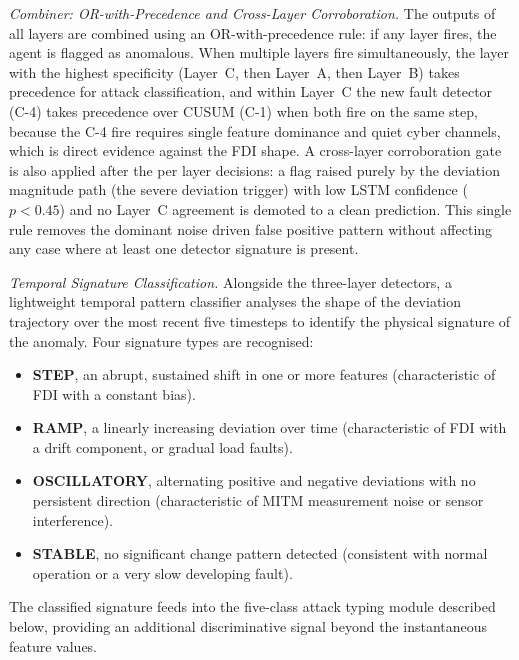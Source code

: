 \par \vspace{0.2cm}
\textit{Combiner: OR-with-Precedence and Cross-Layer Corroboration.} The outputs of all layers are combined using an OR-with-precedence rule: if any layer fires, the agent is flagged as anomalous. When multiple layers fire simultaneously, the layer with the highest specificity (Layer~C, then Layer~A, then Layer~B) takes precedence for attack classification, and within Layer~C the new fault detector (C-4) takes precedence over CUSUM (C-1) when both fire on the same step, because the C-4 fire requires single feature dominance and quiet cyber channels, which is direct evidence against the FDI shape. A cross-layer corroboration gate is also applied after the per layer decisions: a flag raised purely by the deviation magnitude path (the severe deviation trigger) with low LSTM confidence ($p < 0.45$) and no Layer~C agreement is demoted to a clean prediction. This single rule removes the dominant noise driven false positive pattern without affecting any case where at least one detector signature is present.

\par \vspace{0.2cm}
\textit{Temporal Signature Classification.} Alongside the three-layer detectors, a lightweight temporal pattern classifier analyses the shape of the deviation trajectory over the most recent five timesteps to identify the physical signature of the anomaly. Four signature types are recognised:
\begin{itemize}
    \item \textbf{STEP}, an abrupt, sustained shift in one or more features (characteristic of FDI with a constant bias).
    \item \textbf{RAMP}, a linearly increasing deviation over time (characteristic of FDI with a drift component, or gradual load faults).
    \item \textbf{OSCILLATORY}, alternating positive and negative deviations with no persistent direction (characteristic of MITM measurement noise or sensor interference).
    \item \textbf{STABLE}, no significant change pattern detected (consistent with normal operation or a very slow developing fault).
\end{itemize}
The classified signature feeds into the five-class attack typing module described below, providing an additional discriminative signal beyond the instantaneous feature values.


